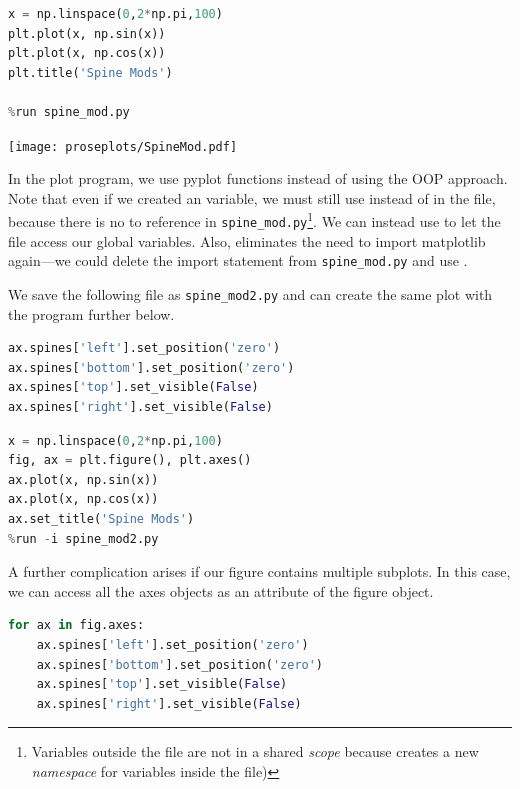 \begin{lstlisting}[language = Python]
x = np.linspace(0,2*np.pi,100)
plt.plot(x, np.sin(x))
plt.plot(x, np.cos(x))
plt.title('Spine Mods')

%run spine_mod.py
\end{lstlisting}

\begin{center}
    \texttt{[image: proseplots/SpineMod.pdf]}
\end{center}

In the plot program, we use pyplot functions instead of using the OOP approach. Note that even if we created an  variable, we must still use  instead of  in the file, because there is no  to reference in \texttt{spine\_mod.py}\footnote{Variables outside the file are not in a shared \emph{scope} because  creates a new \emph{namespace} for variables inside the file)}. We can instead use  to let the file access our global variables. Also,  eliminates the need to import matplotlib again---we could delete the import statement from \texttt{spine\_mod.py} and use . 

We save the following file as \texttt{spine\_mod2.py} and can create the same plot with the program further below. 

\begin{lstlisting}[language = Python,caption = {[spine\_mod2.py]}]
ax.spines['left'].set_position('zero')
ax.spines['bottom'].set_position('zero')
ax.spines['top'].set_visible(False)
ax.spines['right'].set_visible(False)
\end{lstlisting}

\begin{lstlisting}[language = Python]
x = np.linspace(0,2*np.pi,100)
fig, ax = plt.figure(), plt.axes()
ax.plot(x, np.sin(x))
ax.plot(x, np.cos(x))
ax.set_title('Spine Mods')
%run -i spine_mod2.py
\end{lstlisting}

A further complication arises if our figure contains multiple subplots. In this case, we can access all the axes objects as an attribute of the figure object. 


\begin{lstlisting}[language = Python,caption = {[spine\_mod3.py]}]
for ax in fig.axes:
    ax.spines['left'].set_position('zero')
    ax.spines['bottom'].set_position('zero')
    ax.spines['top'].set_visible(False)
    ax.spines['right'].set_visible(False)
\end{lstlisting}



